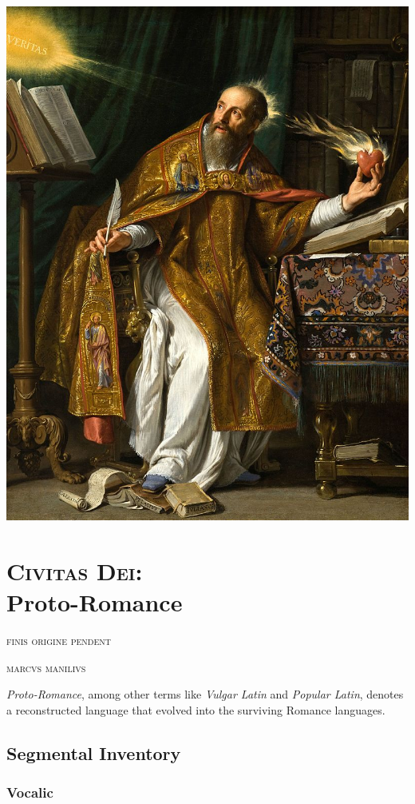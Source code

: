 \documentclass{report}[12pt]
\begin{document}
\pagebreak

\includegraphics[scale=0.5]{augustine.jpg}
\thispagestyle{empty}

\pagebreak

\chapter{\textsc{Civitas Dei}: \\ Proto-Romance}

\epigraph{\textsc{finis origine pendent}}{\textsc{marcvs manilivs}}

\emph{Proto-Romance}, among other terms like \emph{Vulgar Latin} and \emph{Popular Latin}, denotes a reconstructed language that evolved into the surviving Romance languages. 

\section{Segmental Inventory}

\subsection{Vocalic}
\end{document}
